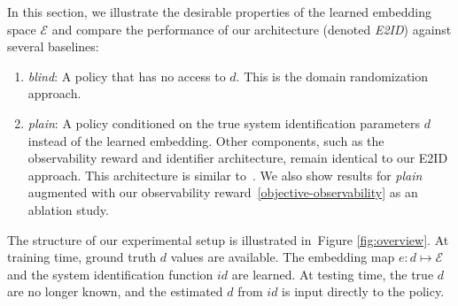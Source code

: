 \documentclass{article}
\newcommand{\TODO}[1]{\textcolor{red}{\textbf{TODO: #1}}}
\newcommand{\cS}{\mathcal{S}}
\newcommand{\blind}{\emph{blind}}
\newcommand{\plain}{\emph{plain}}
\newcommand{\embed}{\emph{E2ID}}
\newcommand{\traj}{\emph{traj}}
\newcommand{\embedfn}{e}
\newcommand{\idfn}{id}
\newcommand{\idvar}{d}
\newcommand{\latset}{\mathcal{E}}
\newcommand{\figref}[1]{Figure \ref{#1}}
\begin{document}
In this section, we illustrate the desirable properties of the learned embedding space $\latset$
and compare the performance of our architecture (denoted \embed) against several baselines:
\begin{enumerate}
\item \blind{}: A policy that has no access to $\idvar$. This is the domain randomization approach.
\item \plain{}: A policy conditioned on the true system identification parameters $\idvar$ instead of the learned embedding.
Other components, such as the observability reward and identifier architecture, remain identical to our E2ID approach.
This architecture is similar to~\citet{yu-up-osi-rss17}.
We also show results for \plain{} augmented with our observability reward~\eqref{objective-observability} as an ablation study.
\end{enumerate}
The structure of our experimental setup is illustrated in~\figref{fig:overview}.
At training time, ground truth $\idvar$ values are available.
The embedding map $\embedfn : \idvar \mapsto \latset$ 
and the system identification function $\idfn$ are learned.
At testing time, the true $\idvar$ are no longer known,
and the estimated $\idvar$ from $\idfn$ is input directly to the policy.
\end{document}
